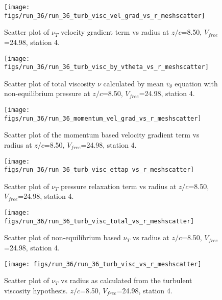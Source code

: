 \begin{figure}[H]
\centering
\texttt{[image: figs/run\_36/run\_36\_turb\_visc\_vel\_grad\_vs\_r\_meshscatter]}
\caption{Scatter plot of $\nu_T$ velocity gradient term vs radius at $z/c$=8.50, $V_{free}$=24.98, station 4.}
\end{figure}


\begin{figure}[H]
\centering
\texttt{[image: figs/run\_36/run\_36\_turb\_visc\_by\_vtheta\_vs\_r\_meshscatter]}
\caption{Scatter plot of total viscosity $\nu$ calculated by mean $\bar{v}_{\theta}$ equation with non-equilibrium pressure at $z/c$=8.50, $V_{free}$=24.98, station 4.}
\end{figure}


\begin{figure}[H]
\centering
\texttt{[image: figs/run\_36/run\_36\_momentum\_vel\_grad\_vs\_r\_meshscatter]}
\caption{Scatter plot of the momentum based velocity gradient term vs radius at $z/c$=8.50, $V_{free}$=24.98, station 4.}
\end{figure}


\begin{figure}[H]
\centering
\texttt{[image: figs/run\_36/run\_36\_turb\_visc\_ettap\_vs\_r\_meshscatter]}
\caption{Scatter plot of $\nu_T$ pressure relaxation term vs radius at $z/c$=8.50, $V_{free}$=24.98, station 4.}
\end{figure}


\begin{figure}[H]
\centering
\texttt{[image: figs/run\_36/run\_36\_turb\_visc\_total\_vs\_r\_meshscatter]}
\caption{Scatter plot of non-equilibrium based $\nu_T$ vs radius at $z/c$=8.50, $V_{free}$=24.98, station 4.}
\end{figure}


\begin{figure}[H]
\centering
\texttt{[image: figs/run\_36/run\_36\_turb\_visc\_vs\_r\_meshscatter]}
\caption{Scatter plot of $\nu_T$ vs radius as calculated from the turbulent viscosity hypothesis. $z/c$=8.50, $V_{free}$=24.98, station 4.}
\end{figure}


